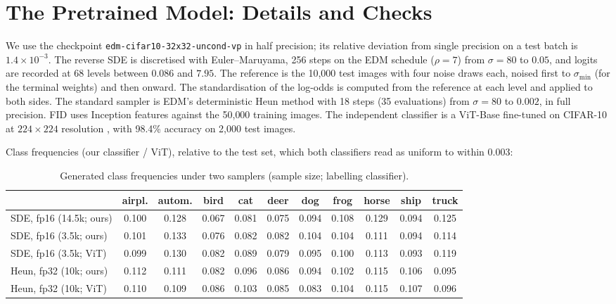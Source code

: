 \section{The Pretrained Model: Details and Checks}
\label{app:pretrained}

We use the checkpoint \texttt{edm-cifar10-32x32-uncond-vp} \citep{karras2022elucidating} in half precision; its relative deviation from single precision on a test batch is $1.4\times10^{-3}$. The reverse SDE is discretised with Euler--Maruyama, 256 steps on the EDM schedule ($\rho=7$) from $\sigma=80$ to $0.05$, and logits are recorded at 68 levels between $0.086$ and $7.95$. The reference is the 10{,}000 test images with four noise draws each, noised first to $\sigma_{\min}$ (for the terminal weights) and then onward. The standardisation of the log-odds is computed from the reference at each level and applied to both sides. The standard sampler is EDM's deterministic Heun method with 18 steps (35 evaluations) from $\sigma=80$ to $0.002$, in full precision. FID uses Inception features \citep{heusel2017gans} against the 50{,}000 training images. The independent classifier is a ViT-Base fine-tuned on CIFAR-10 at $224\times224$ resolution \citep{dosovitskiy2021image}, with 98.4\% accuracy on 2{,}000 test images.

Class frequencies (our classifier / ViT), relative to the test set, which both classifiers read as uniform to within $0.003$:

\begin{table}[h]
\centering
\small
\caption{Generated class frequencies under two samplers (sample size; labelling classifier).}
\footnotesize\setlength{\tabcolsep}{3pt}
\begin{tabular}{lcccccccccc}
\toprule
 & airpl. & autom. & bird & cat & deer & dog & frog & horse & ship & truck \\
\midrule
SDE, fp16 (14.5k; ours) & 0.100 & 0.128 & 0.067 & 0.081 & 0.075 & 0.094 & 0.108 & 0.129 & 0.094 & 0.125 \\
SDE, fp16 (3.5k; ours) & 0.101 & 0.133 & 0.076 & 0.082 & 0.082 & 0.104 & 0.104 & 0.111 & 0.094 & 0.114 \\
SDE, fp16 (3.5k; ViT) & 0.099 & 0.130 & 0.082 & 0.089 & 0.079 & 0.095 & 0.100 & 0.113 & 0.093 & 0.119 \\
Heun, fp32 (10k; ours) & 0.112 & 0.111 & 0.082 & 0.096 & 0.086 & 0.094 & 0.102 & 0.115 & 0.106 & 0.095 \\
Heun, fp32 (10k; ViT) & 0.110 & 0.109 & 0.086 & 0.103 & 0.085 & 0.083 & 0.104 & 0.115 & 0.107 & 0.096 \\
\bottomrule
\end{tabular}
\end{table}


